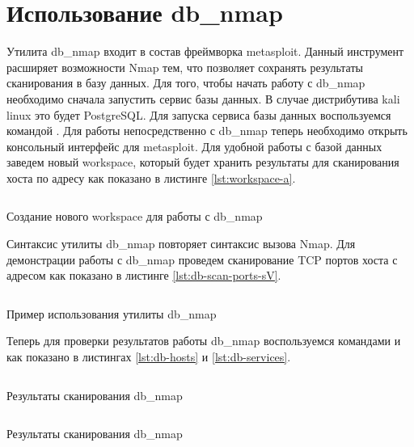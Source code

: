 \section{Использование db\_nmap}

Утилита db\_nmap входит в состав фреймворка metasploit. Данный инструмент расширяет возможности Nmap тем, что позволяет сохранять 
результаты сканирования в базу данных. Для того, чтобы начать работу с db\_nmap необходимо сначала запустить сервис базы данных. В 
случае дистрибутива kali linux это будет PostgreSQL. Для запуска сервиса базы данных воспользуемся командой 
. Для работы непосредственно с db\_nmap теперь необходимо открыть консольный интерфейс для metasploit. 
Для удобной работы с базой данных заведем новый workspace, который будет хранить результаты для сканирования хоста по адресу 
 как показано в листинге \ref{lst:workspace-a}.

\begin{listing}[H]
    \inputminted{console}{resources/14_workspace_a}
    \caption{Создание нового workspace для работы с db\_nmap}
    \label{lst:workspace-a}
\end{listing}

Синтаксис утилиты db\_nmap повторяет синтаксис вызова Nmap. Для демонстрации работы с db\_nmap проведем сканирование TCP портов хоста
с адресом  как показано в листинге \ref{lst:db-scan-ports-sV}.

\begin{listing}[H]
    \inputminted{console}{resources/15_db_scan_ports_sV}
    \caption{Пример использования утилиты db\_nmap}
    \label{lst:db-scan-ports-sV}
\end{listing}

Теперь для проверки результатов работы db\_nmap воспользуемся командами  и  как показано в листингах 
\ref{lst:db-hosts} и \ref{lst:db-services}.

\begin{listing}[H]
    \inputminted{console}{resources/16_db_scan_hosts}
    \caption{Результаты сканирования db\_nmap}
    \label{lst:db-hosts}
\end{listing}

\begin{listing}[H]
    \inputminted{console}{resources/17_db_services}
    \caption{Результаты сканирования db\_nmap}
    \label{lst:db-services}
\end{listing}